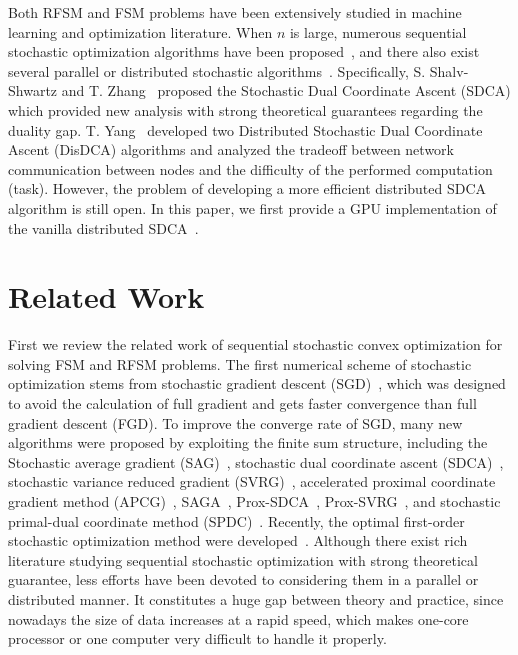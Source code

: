 \documentclass{article}
\begin{document}
Both RFSM and FSM problems have been extensively studied in machine learning and
optimization literature. When $n$ is large, numerous sequential stochastic
optimization algorithms have been
proposed~\cite{bottou2010large,nemirovski2009robust,roux2012stochastic,shalev2013stochastic,shalev2013accelerated,johnson2013accelerating,ouyang2013stochastic,
suzuki2013dual,shalev2014accelerated,xiao2014proximal,defazio2014saga,zhang2015stochastic,lin2014accelerated,defazio2016simple,allen2016katyusha,lan2015optimal},
and there also exist several parallel or distributed stochastic
algorithms~\cite{boyd2011distributed,recht2011hogwild,zinkevich2010parallelized,yang2013trading,zhang2014asynchronous,zinkevich2010parallelized,agarwal2011distributed}.
Specifically, S. Shalv-Shwartz and T. Zhang~\cite{shalev2013stochastic} proposed
the Stochastic Dual Coordinate Ascent (SDCA) which provided new analysis with strong theoretical
guarantees regarding the duality gap. T. Yang~\cite{yang2013trading,yang2013analysis} developed two 
Distributed Stochastic Dual Coordinate Ascent (DisDCA) algorithms and analyzed
the tradeoff between network communication between nodes and the difficulty of
the performed computation (task). However, the problem of developing a more
efficient distributed SDCA algorithm is still open. In this paper, we first
provide a GPU implementation of the vanilla distributed
SDCA~\cite{yang2013trading}. 

\section{Related Work}
First we review the related work of sequential stochastic convex optimization
for solving FSM and RFSM problems. The first numerical scheme of stochastic
optimization stems from stochastic gradient descent
(SGD)~\cite{bottou2010large,nemirovski2009robust}, which was designed to avoid
the calculation of full gradient and gets faster convergence than full gradient
descent (FGD). To improve the converge rate of SGD, many new algorithms were
proposed by exploiting the finite sum structure, including the Stochastic
average gradient (SAG)~\cite{roux2012stochastic}, stochastic dual coordinate
ascent (SDCA)~\cite{shalev2013stochastic}, stochastic variance reduced gradient
(SVRG)~\cite{johnson2013accelerating}, accelerated proximal coordinate gradient method
(APCG)~\cite{lin2014accelerated},  SAGA~\cite{Defazio2014},
Prox-SDCA~\cite{shalev2014accelerated}, Prox-SVRG~\cite{xiao2014proximal}, and
stochastic primal-dual coordinate method (SPDC)~\cite{zhang2015stochastic}.
Recently, the optimal first-order stochastic optimization method were
developed~\cite{allen2016katyusha,lan2015optimal}. Although there exist rich
literature studying sequential stochastic optimization with strong theoretical
guarantee, less efforts have been devoted to considering them in a parallel or
distributed manner. It constitutes a huge gap between theory and practice, since
nowadays the size of data increases at a rapid speed, which makes one-core
processor or one computer very difficult to handle it properly. 
\end{document}
